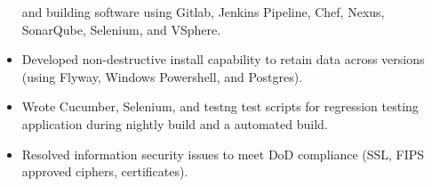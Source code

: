 \documentclass[12pt, line, margin]{res}
\begin{document}
\begin{resume}
\begin{itemize}
                               and building software using Gitlab, Jenkins Pipeline, Chef, Nexus,
                               SonarQube, Selenium, and VSphere.
	      \item   Developed non-destructive install capability to retain data across\newline
                               versions (using Flyway, Windows Powershell, and Postgres). 
                \item   Wrote Cucumber, Selenium, and testng test scripts for regression \newline
                               testing application during nightly build and a automated \newline 
                               build.
	      \item   Resolved information security issues to meet DoD compliance\newline
                               (SSL, FIPS approved ciphers, certificates).
                \end{itemize}
 
\pagebreak


\end{resume}
\end{document}
